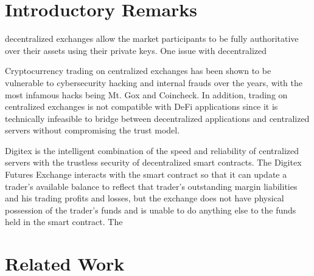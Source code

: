 

\section{Introductory Remarks}




decentralized exchanges allow the market participants to be fully authoritative over their assets using their private keys. 
One issue with decentralized 

Cryptocurrency trading on centralized exchanges has been shown to be vulnerable to cybersecurity hacking and internal frauds over the years, with the most infamous hacks being Mt. Gox and Coincheck. In addition, trading on centralized exchanges is not compatible with DeFi applications since it is technically infeasible to bridge between decentralized applications and centralized servers without compromising the trust model.


Digitex is the intelligent combination of the speed and reliability of centralized servers with the trustless security of decentralized smart contracts. The Digitex Futures Exchange interacts with the smart contract so that it can update a trader’s available balance to reflect that trader’s outstanding margin liabilities and his trading profits and losses, but the exchange does not have physical possession of the trader’s funds and is unable to do anything else to the funds held in the smart contract.
The







\section{Related Work}









